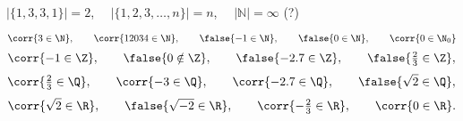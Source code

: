 \begin{example}
 $|\{1,3,3,1\}|=2$, $ \quad |\{1,2,3, \ldots, n \}| = n$,
  $ \quad | \mathbb{N} | = \infty$ (?)
\end{example}

\begin{exercise}
$$
\corr{3\in \N}, \qquad \corr{12034\in\N}, \qquad \false{-1\in\N}, \qquad \false{0\in\N}, \qquad \corr{0\in\N_0}
$$
$$
\corr{-1\in\Z}, \qquad \false{0\notin\Z}, \qquad \false{-2.7\in\Z}, \qquad \false{\tfrac23\in\Z},
$$
$$
\corr{\tfrac23\in\Q}, \qquad \corr{-3\in\Q}, \qquad \corr{-2.7\in\Q}, \qquad \false{\sqrt{2}\in\Q},
$$
$$
\corr{\sqrt{2}\in\R}, \qquad \false{\sqrt{-2}\in\R}, \qquad \corr{-\tfrac23\in\R}, \qquad \corr{0\in\R}.
$$
\end{exercise}

